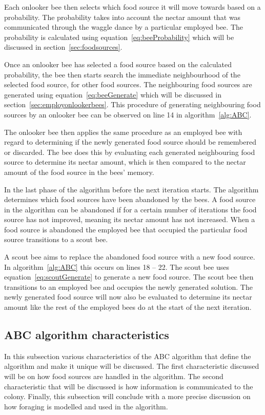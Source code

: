 Each onlooker bee then selects which food source it will move towards based on a probability. The probability takes into account the nectar amount that was communicated through the waggle dance by a particular employed bee. The probability is calculated using equation~\ref{eq:beeProbability} which will be discussed in section~\ref{sec:foodsources}.

Once an onlooker bee has selected a food source based on the calculated probability, the bee then starts search the immediate neighbourhood of the selected food source, for other food sources. The neighbouring food sources are generated using equation~\ref{eq:beeGenerate} which will be discussed in section~\ref{sec:employonlookerbees}. This procedure of generating neighbouring food sources by an onlooker bee can be observed on line 14 in algorithm~\ref{alg:ABC}.

The onlooker bee then applies the same procedure as an employed bee with regard to determining if the newly generated food source should be remembered or discarded. The bee does this by evaluating each generated neighbouring food source to determine its nectar amount, which is then compared to the nectar amount of the food source in the bees' memory.

In the last phase of the algorithm before the next iteration starts. The algorithm determines which food sources have been abandoned by the bees. A food source in the algorithm can be abandoned if for a certain number of iterations the food source has not improved, meaning its nectar amount has not increased. When a food source is abandoned the employed bee that occupied the particular food source transitions to a scout bee.

A scout bee aims to replace the abandoned food source with a new food source. In algorithm~\ref{alg:ABC} this occurs on lines 18 -- 22. The scout bee uses equation~\ref{eq:scoutGenerate} to generate a new food source. The scout bee then transitions to an employed bee and occupies the newly generated solution. The newly generated food source will now also be evaluated to determine its nectar amount like the rest of the employed bees do at the start of the next iteration.

\subsection{ABC algorithm characteristics}
In this subsection various characteristics of the ABC algorithm that define the algorithm and make it unique will be discussed. The first characteristic discussed will be on how food sources are handled in the algorithm. The second characteristic that will be discussed is how information is communicated to the colony. Finally, this subsection will conclude with a more precise discussion on how foraging is modelled and used in the algorithm.

